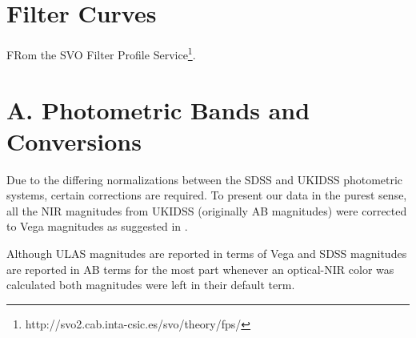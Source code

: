 \documentclass[usenatbib]{mnras}
\begin{document}
\newpage

\appendix
\section{Filter Curves} 
FRom the SVO Filter Profile Service\footnote{http://svo2.cab.inta-csic.es/svo/theory/fps/}.

\section{A. Photometric Bands and Conversions}
    Due to the differing normalizations between the
    SDSS and  UKIDSS photometric systems, certain corrections are required.  To present
    our data in the  purest sense, all the NIR magnitudes from UKIDSS
    (originally AB magnitudes)  were corrected to Vega magnitudes as
    suggested in \citet{Hewett2006}.
    
    Although ULAS magnitudes are reported in terms of Vega and SDSS
    magnitudes are reported in AB terms for the most part whenever an
    optical-NIR color was calculated both magnitudes were left in their
    default term.
    
\end{document}

